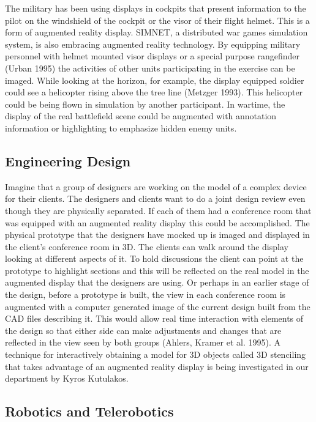 The military has been using displays in cockpits that present information to the pilot on the windshield of the cockpit or the visor of their flight helmet. This is a form of augmented reality display. SIMNET, a distributed war games simulation system, is also embracing augmented reality technology. By equipping military personnel with helmet mounted visor displays or a special purpose rangefinder (Urban 1995) the activities of other units participating in the exercise can be imaged. While looking at the horizon, for example, the display equipped soldier could see a helicopter rising above the tree line (Metzger 1993). This helicopter could be being flown in simulation by another participant. In wartime, the display of the real battlefield scene could be augmented with annotation information or highlighting to emphasize hidden enemy units.

\subsection{Engineering Design}

Imagine that a group of designers are working on the model of a complex device for their clients. The designers and clients want to do a joint design review even though they are physically separated. If each of them had a conference room that was equipped with an augmented reality display this could be accomplished. The physical prototype that the designers have mocked up is imaged and displayed in the client's conference room in 3D. The clients can walk around the display looking at different aspects of it. To hold discussions the client can point at the prototype to highlight sections and this will be reflected on the real model in the augmented display that the designers are using. Or perhaps in an earlier stage of the design, before a prototype is built, the view in each conference room is augmented with a computer generated image of the current design built from the CAD files describing it. This would allow real time interaction with elements of the design so that either side can make adjustments and changes that are reflected in the view seen by both groups (Ahlers, Kramer et al. 1995). A technique for interactively obtaining a model for 3D objects called 3D stenciling that takes advantage of an augmented reality display is being investigated in our department by Kyros Kutulakos.

\subsection{Robotics and Telerobotics}

